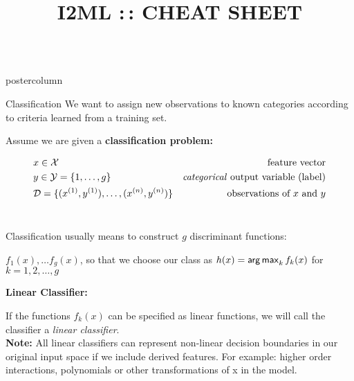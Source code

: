\documentclass{beamer}
\title{I2ML :\,: CHEAT SHEET} %
\newlength{\columnheight} %
\begin{document}
\begin{frame}[fragile]{}
\begin{columns}
	\begin{column}{.31\textwidth}
		\begin{beamercolorbox}[center]{postercolumn}
			\begin{minipage}{.98\textwidth}
				\parbox[t][\columnheight]{\textwidth}{				
					\begin{myblock}{Classification}
						We want to assign new observations to known categories according to criteria learned from a training set.  
						\\
						\begin{codebox}
						    Assume we are given a \textbf{classification problem:}
						\end{codebox}
						\hspace*{1ex}\begin{eqnarray*} & x \in \mathcal{X} \quad & \text{feature vector}\\ & y \in \mathcal{Y} = \{1, \ldots, g\} \quad & \text{\emph{categorical} output variable (label)}\\ &\mathcal{D} = \{ (x^{(1)}, y^{(1)}), \ldots, (x^{(n)}, y^{(n)})\} & \text{observations of $x$ and $y$} \end{eqnarray*}\\
						\begin{codebox}
							Classification usually means to construct $g$ discriminant functions:
						\end{codebox}
						\hspace*{1ex}$f_1(x), \ldots f_g(x)$, so that we choose our class as $h(x) = \mathop{\sf arg\,max}_k f_k(x)$ \hspace*{1ex}for $k = 1, 2,\ldots, g$
						\\
						\begin{codebox}
							\textbf{Linear Classifier:}
						\end{codebox}
						\hspace*{1ex}If the functions $f_k(x)$ can be specified as linear functions, we will call \hspace*{1ex}the classifier a \emph{linear classifier}.
						\\
						
						\hspace*{1ex}\textbf{Note: }All linear classifiers can represent non-linear decision boundaries \hspace*{1ex}in our original input space if we include derived features. For example: \hspace*{1ex}higher order interactions, polynomials or other transformations of x in \hspace*{1ex}the model.
						\\
			

\end{myblock}}
\end{minipage}
\end{beamercolorbox}
\end{column}
\end{columns}
\end{frame}
\end{document}
